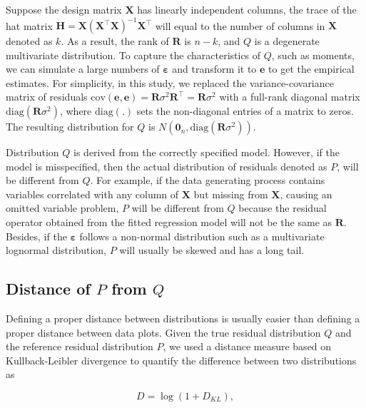 \documentclass[]{interact}
\theoremstyle{plain}%
\theoremstyle{definition}
\theoremstyle{remark}
\begin{document}
Suppose the design matrix \(\boldsymbol{X}\) has linearly independent
columns, the trace of the hat matrix
\(\boldsymbol{H} = \boldsymbol{X}(\boldsymbol{X}^\top\boldsymbol{X})^{-1}\boldsymbol{X}^\top\)
will equal to the number of columns in \(\boldsymbol{X}\) denoted as
\(k\). As a result, the rank of \(\boldsymbol{R}\) is \(n - k\), and
\(Q\) is a degenerate multivariate distribution. To capture the
characteristics of \(Q\), such as moments, we can simulate a large
numbers of \(\boldsymbol{\varepsilon}\) and transform it to
\(\boldsymbol{e}\) to get the empirical estimates. For simplicity, in
this study, we replaced the variance-covariance matrix of residuals
\(\text{cov}(\boldsymbol{e}, \boldsymbol{e}) = \boldsymbol{R}\sigma^2\boldsymbol{R}^\top = \boldsymbol{R}\sigma^2\)
with a full-rank diagonal matrix
\(\text{diag}(\boldsymbol{R}\sigma^2)\), where \(\text{diag}(.)\) sets
the non-diagonal entries of a matrix to zeros. The resulting
distribution for \(Q\) is
\(N(\boldsymbol{0}_n, \text{diag}(\boldsymbol{R}\sigma^2))\).

Distribution \(Q\) is derived from the correctly specified model.
However, if the model is misspecified, then the actual distribution of
residuals denoted as \(P\), will be different from \(Q\). For example,
if the data generating process contains variables correlated with any
column of \(\boldsymbol{X}\) but missing from \(\boldsymbol{X}\),
causing an omitted variable problem, \(P\) will be different from \(Q\)
because the residual operator obtained from the fitted regression model
will not be the same as \(\boldsymbol{R}\). Besides, if the
\(\boldsymbol{\varepsilon}\) follows a non-normal distribution such as a
multivariate lognormal distribution, \(P\) will usually be skewed and
has a long tail.

\subsection{\texorpdfstring{Distance of \(P\) from
\(Q\)}{Distance of P from Q}}\label{distance-of-p-from-q}

Defining a proper distance between distributions is usually easier than
defining a proper distance between data plots. Given the true residual
distribution \(Q\) and the reference residual distribution \(P\), we
used a distance measure based on Kullback-Leibler divergence
\citep{kullback1951information} to quantify the difference between two
distributions as

\begin{equation} \label{eq:kl-0}
D = \log\left(1 + D_{KL}\right),
\end{equation}
\end{document}
